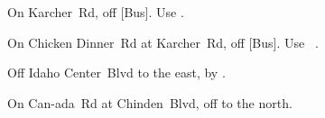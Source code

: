 
\begin{LocationList}

On  Karcher~Rd, off [Bus].
Use  .

On Chicken Dinner~Rd at  Karcher~Rd, off [Bus].
Use~ .

Off Idaho Center~Blvd to the east, by  .

On Can-ada~Rd at   Chinden~Blvd, off   to the north.

\end{LocationList}

